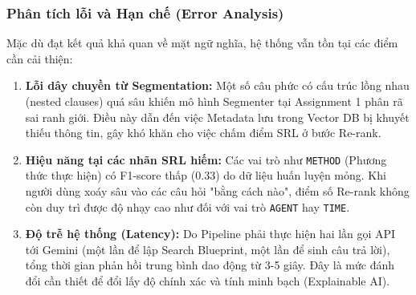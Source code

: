 \subsubsection{Phân tích lỗi và Hạn chế (Error Analysis)}
Mặc dù đạt kết quả khả quan về mặt ngữ nghĩa, hệ thống vẫn tồn tại các điểm cần cải thiện:
\begin{enumerate}
    \item \textbf{Lỗi dây chuyền từ Segmentation:} Một số câu phức có cấu trúc lồng nhau (nested clauses) quá sâu khiến mô hình Segmenter tại Assignment 1 phân rã sai ranh giới. Điều này dẫn đến việc Metadata lưu trong Vector DB bị khuyết thiếu thông tin, gây khó khăn cho việc chấm điểm SRL ở bước Re-rank.
    \item \textbf{Hiệu năng tại các nhãn SRL hiếm:} Các vai trò như \texttt{METHOD} (Phương thức thực hiện) có F1-score thấp (0.33) do dữ liệu huấn luyện mỏng. Khi người dùng xoáy sâu vào các câu hỏi "bằng cách nào", điểm số Re-rank không còn duy trì được độ nhạy cao như đối với vai trò \texttt{AGENT} hay \texttt{TIME}.
    \item \textbf{Độ trễ hệ thống (Latency):} Do Pipeline phải thực hiện hai lần gọi API tới Gemini (một lần để lập Search Blueprint, một lần để sinh câu trả lời), tổng thời gian phản hồi trung bình dao động từ 3-5 giây. Đây là mức đánh đổi cần thiết để đổi lấy độ chính xác và tính minh bạch (Explainable AI).
\end{enumerate}